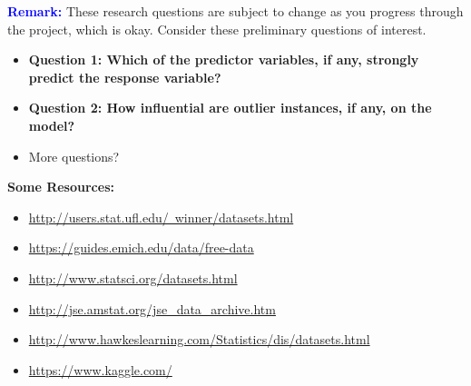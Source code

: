 \documentclass{article}\usepackage[]{graphicx}\usepackage[]{xcolor}
\begin{document}
\begin{enumerate}[1.]
\textbf{\textcolor{blue}{Remark:}} These research questions are subject to change as you progress through the project, which is okay. Consider these preliminary questions of interest. 
	\vspace{.2cm}

\begin{itemize}
	\item \textbf{Question 1: Which of the predictor variables, if any, strongly predict the response variable?}
	\vspace{.2cm}
	\item \textbf{Question 2: How influential are outlier instances, if any, on the model?}
	\vspace{.2cm}
	\item More questions? 
\end{itemize}
\end{enumerate}

\vspace{.2cm}

\textbf{Some Resources:}
\begin{itemize}
	\item \href{http://users.stat.ufl.edu/~winner/datasets.html}{http://users.stat.ufl.edu/~winner/datasets.html}
	\item \href{https://guides.emich.edu/data/free-data}{https://guides.emich.edu/data/free-data}
	\item \href{http://www.statsci.org/datasets.html}{http://www.statsci.org/datasets.html}
	\item \href{http://jse.amstat.org/jse_data_archive.htm}{http://jse.amstat.org/jse\_data\_archive.htm}
	\item \href{http://www.hawkeslearning.com/Statistics/dis/datasets.html}{http://www.hawkeslearning.com/Statistics/dis/datasets.html}
	\item \href{https://www.kaggle.com/}{https://www.kaggle.com/}
\end{itemize}
\end{document}

